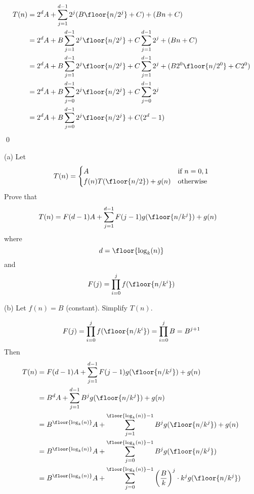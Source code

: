 \begin{align*}
T(n) 
&= 2^{d} A +
   \sum_{j=1}^{d-1} 2^{j}( B \floor{n/2^{j}} + C)
   + (Bn + C)
\\
&= 2^{d} A +
   B\sum_{j=1}^{d-1} 2^{j}\floor{n/2^{j}} + C\sum_{j=1}^{d-1} 2^j
   + (Bn + C)
\\
&= 2^{d} A +
   B\sum_{j = 1}^{d-1} 2^{j}\floor{n/2^{j}} + C\sum_{j=1}^{d-1} 2^j
   + (B 2^0 \floor{n/2^0} + C2^0)
\\
&= 2^{d} A +
   B\sum_{j = 0}^{d-1} 2^{j}\floor{n/2^{j}} + C\sum_{j=0}^{d-1} 2^j
\\
&= 2^{d} A +
   B\sum_{j = 0}^{d-1} 2^{j}\floor{n/2^{j}} + C(2^{d} - 1)
\end{align*}
\qed

\begin{ex}
(a) Let
\[
T(n) =
\begin{cases}
A                          & \text{if $n = 0, 1$} \\
f(n) T(\floor{n/2}) + g(n) & \text{otherwise} 
\end{cases}
\]
Prove that
\begin{align*}
T(n) 
&= F(d-1) A +
   \sum_{j = 1}^{d-1} F(j-1)g(\floor{n/k^{j}})
   + g(n) 
\end{align*}
where
\[
d = \floor{\log_k (n)}
\]
and 
\[
F(j) = \prod_{i=0}^{j} f(\floor{n/k^{i}})
\]

(b) Let $f(n) = B$ (constant).
Simplify $T(n)$.
\end{ex}

\begin{align*}
F(j) 
= \prod_{i=0}^{j} f(\floor{n/k^{i}}) = \prod_{i=0}^j B
= B^{j + 1}
\end{align*}
Then
\begin{align*}
T(n) 
&= F(d-1) A +
   \sum_{j = 1}^{d-1} F(j-1)g(\floor{n/k^{j}})
   + g(n) 
\\
&= B^d A +
   \sum_{j = 1}^{d-1} B^j g(\floor{n/k^{j}})
   + g(n) 
\\
&= B^{\floor{\log_k(n)}} A +
   \sum_{j = 1}^{\floor{\log_k(n)}-1} B^j g(\floor{n/k^{j}})
   + g(n) 
\\
&= B^{\floor{\log_k(n)}} A +
   \sum_{j = 0}^{\floor{\log_k(n)}-1} B^j g(\floor{n/k^{j}})
\\
&= B^{\floor{\log_k(n)}} A +
   \sum_{j = 0}^{\floor{\log_k(n)}-1} 
   \left( 
     \frac{B}{k}
   \right)^j 
   \cdot k^j g(\floor{n/k^{j}})
\end{align*}

